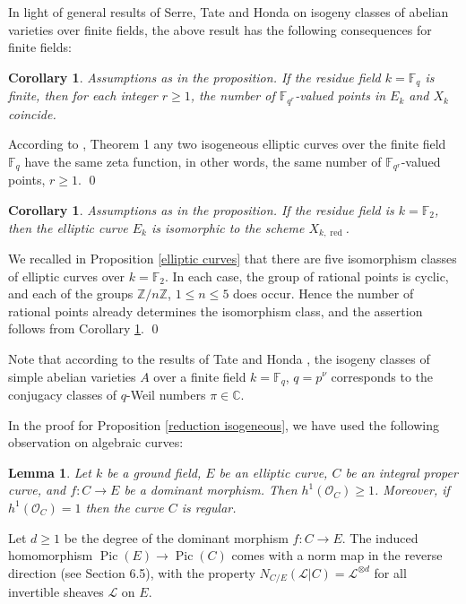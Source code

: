 \documentclass[oneside, 12pt]{amsart}
\newcommand\mylabel[1]{\label{#1}\marginpar{\vspace{-1ex}\medskip\medskip\footnotesize \tt #1}}
\renewcommand\mylabel[1]{\label{#1}}
\newtheorem{lemma}[theorem]{Lemma}
\newtheorem{corollary}[theorem]{Corollary}
\theoremstyle{definition}
\theoremstyle{remark}
\newcommand{\ZZ}{\mathbb{Z}}
\newcommand{\CC}{\mathbb{C}}
\newcommand{\FF}{\mathbb{F}}
\newcommand{\shL}{\mathscr{L}}
\renewcommand{\O}{\mathscr{O}}
\newcommand{\Pic}{\operatorname{Pic}}
\newcommand{\ra}{\rightarrow}
\newcommand{\red}{{\operatorname{red}}}
\begin{document}
In light of general results of Serre, Tate and Honda on isogeny classes of abelian varieties over finite fields,
the  above result has the following consequences for finite fields:

\begin{corollary}
\mylabel{reduction same zeta}
Assumptions as in the proposition. If the residue field $k=\FF_q$ is finite, 
then for each integer $r\geq 1$, the number of $\FF_{q^r}$-valued points
in $E_k$ and $X_k$ coincide.
\end{corollary}

\proof
According to  \cite{Tate 1982}, Theorem 1 any    two isogeneous elliptic curves over 
the finite field $\FF_q$ have the same    zeta function, in other words,
the same number of $\FF_{q^r}$-valued points, $r\geq 1$.
\qed

\begin{corollary}
\mylabel{reduction isomorphic}
Assumptions as in the proposition. If the residue field is $k=\FF_2$, then
the elliptic curve $E_k$ is isomorphic to the scheme $X_{k,\red}$.
\end{corollary}

\proof
We recalled in Proposition \ref{elliptic curves} that  there are five isomorphism classes of elliptic
curves over $k=\FF_2$. In each case, the group of rational points is cyclic, and each of the
groups $\ZZ/n\ZZ$, $1\leq n\leq 5$ does occur. Hence the number of rational points 
already determines the isomorphism class, and the assertion follows from Corollary \ref{reduction same zeta}.
\qed

\medskip
Note that according to the results of  Tate \cite{Tate 1982} and Honda \cite{Honda 1968},
the isogeny classes of simple abelian varieties $A$ over a finite field $k=\FF_q$, $q=p^\nu$
corresponds to the conjugacy classes of $q$-Weil numbers $\pi\in\CC$.

In the proof for Proposition \ref{reduction isogeneous}, we have used the following observation on algebraic curves:

\begin{lemma}
\mylabel{covering}
Let $k$ be a ground field, $E$ be an elliptic curve, $C$ be an integral proper curve, and $f:C\ra E$ be a dominant morphism.
Then  $h^1(\O_C)\geq 1$. Moreover,  if $h^1(\O_C)=1$ then the curve $C$ is regular.
\end{lemma}

\proof
Let $d\geq 1$ be the degree of the dominant morphism $f:C\ra E$.
The induced homomorphism $\Pic(E)\ra\Pic(C)$ comes with a norm map in the reverse direction (see \cite{EGA II} Section 6.5), 
with the property $N_{C/E}(\shL|C)=\shL^{\otimes d}$ for all invertible sheaves $\shL$ on $E$.
\end{document}
